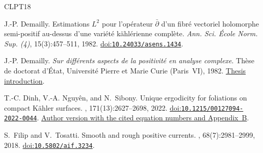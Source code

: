 \documentclass[11pt]{amsart}
\theoremstyle{definition}
\theoremstyle{remark}
\numberwithin{equation}{section}
\newcommand{\barp}{\bar\partial}
\begin{document}
\begin{thebibliography}{CLPT18}

J.-P. Demailly.
\newblock Estimations $L^2$ pour l'op\'erateur $\barp$ d'un fibr\'e
vectoriel holomorphe semi-positif au-dessus d'une vari\'et\'e
k\"ahl\'erienne compl\`ete.
\newblock \emph{Ann. Sci. \'Ecole Norm. Sup. (4)}, 15(3):457--511, 1982.
\newblock \href{https://doi.org/10.24033/asens.1434}{doi:\nolinkurl{10.24033/asens.1434}}.

J.-P. Demailly.
\newblock \emph{Sur diff\'erents aspects de la positivit\'e en analyse complexe}.
\newblock Th\`ese de doctorat d'\'Etat, Universit\'e Pierre et Marie Curie
(Paris~VI), 1982.
\newblock \href{https://www-fourier.ujf-grenoble.fr/~demailly/manuscripts/these_etat_intro.pdf}{Thesis introduction}.

T.-C. Dinh, V.-A. Nguy\^en, and N.~Sibony.
\newblock Unique ergodicity for foliations on compact {K\"ahler} surfaces.
, 171(13):2627--2698, 2022.
\newblock \href{https://doi.org/10.1215/00127094-2022-0044}{doi:\nolinkurl{10.1215/00127094-2022-0044}}. \href{https://arxiv.org/abs/1811.07450v2}{Author version with the cited equation numbers and Appendix~B}.


S.~Filip and V.~Tosatti.
\newblock Smooth and rough positive currents.
, 68(7):2981--2999, 2018.
\newblock \href{https://doi.org/10.5802/aif.3234}{doi:\nolinkurl{10.5802/aif.3234}}.



\end{thebibliography}
\end{document}
